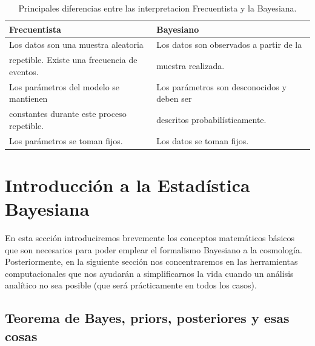 \documentclass[onecolumn,           %
               showpacs,            %
               preprintnumbers,     %
               aps,                 %
               prl,          	    %
               letterpaper,             %
               superscriptaddress,      %
               nofootinbib,         %
               tightenlines,        %
               floats,floatfix      %
               ,usenatbib,
               ]{revtex4-1}
\begin{document}
\begin{table}[h!]
\centering
\begin{tabular}{||l|l||} 
 \hline
 \textbf{Frecuentista} & \textbf{Bayesiano} \\ [0.5ex] 
 \hline\hline
 Los datos son una muestra aleatoria  & Los datos son observados a partir de la  \\ 
 repetible. Existe una frecuencia de eventos. &muestra realizada. \\
 \hline 
Los par\'ametros del modelo se mantienen& Los par\'ametros son desconocidos y deben ser \\
 constantes durante este proceso repetible. & descritos probabil\'isticamente. \\
\hline
Los par\'ametros se toman fijos. & Los datos se toman fijos.\\ [1ex] 
 \hline
\end{tabular}
\caption{\footnotesize{Principales diferencias entre las interpretacion Frecuentista y la Bayesiana.}}
\label{table:1}
\end{table}

\section{Introducci\'on a la Estad\'istica Bayesiana}

En esta secci\'on introduciremos brevemente los conceptos matem\'aticos b\'asicos que son necesarios para poder emplear el formalismo Bayesiano a la cosmolog\'ia. Posteriormente, en la siguiente secci\'on nos concentraremos en las herramientas computacionales que nos ayudar\'an a simplificarnos la vida cuando un an\'alisis anal\'itico no sea posible (que ser\'a pr\'acticamente en todos los casos). 

\subsection{Teorema de Bayes, priors, posteriores y esas cosas}
\end{document}
